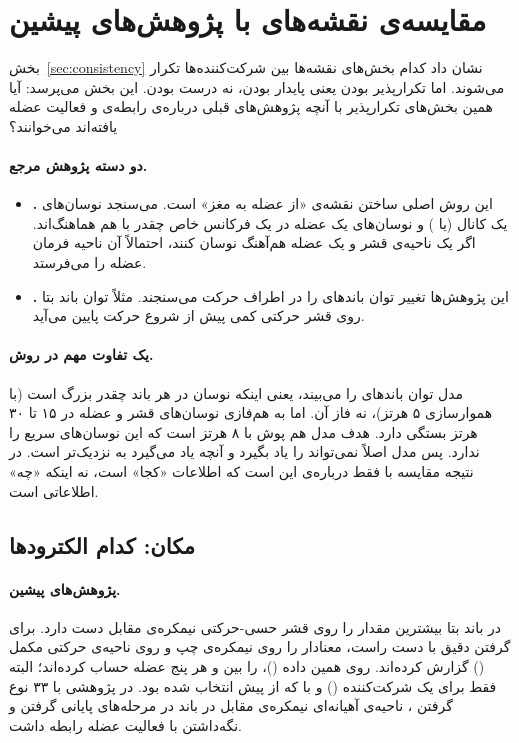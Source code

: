 \FloatBarrier
\section{مقایسه‌ی نقشه‌های  با پژوهش‌های پیشین}
\label{sec:literature}

بخش~\ref{sec:consistency} نشان داد کدام بخش‌های نقشه‌ها بین شرکت‌کننده‌ها تکرار می‌شوند. اما تکرارپذیر بودن یعنی پایدار بودن، نه درست بودن. این بخش می‌پرسد: آیا همین بخش‌های تکرارپذیر با آنچه پژوهش‌های قبلی درباره‌ی رابطه‌ی  و فعالیت عضله یافته‌اند می‌خوانند؟

\paragraph{دو دسته پژوهش مرجع.}
\begin{itemize}
\item \textbf{.} این روش اصلی ساختن نقشه‌ی «از عضله به مغز» است.  می‌سنجد نوسان‌های یک کانال  (یا ) و نوسان‌های  یک عضله در یک فرکانس خاص چقدر با هم هماهنگ‌اند. اگر یک ناحیه‌ی قشر و یک عضله هم‌آهنگ نوسان کنند، احتمالاً آن ناحیه فرمان عضله را می‌فرستد.
\item \textbf{.} این پژوهش‌ها تغییر توان باندهای  را در اطراف حرکت می‌سنجند. مثلاً توان باند بتا روی قشر حرکتی کمی پیش از شروع حرکت پایین می‌آید.
\end{itemize}

\paragraph{یک تفاوت مهم در روش.} مدل  توان باندهای  را می‌بیند، یعنی اینکه نوسان در هر باند چقدر بزرگ است (با هموارسازی ۵ هرتز)، نه فاز آن.  اما به هم‌فازی نوسان‌های قشر و عضله در ۱۵ تا ۳۰ هرتز بستگی دارد. هدف مدل هم پوش  با  ۸ هرتز است که این نوسان‌های سریع را ندارد. پس مدل اصلاً نمی‌تواند  را یاد بگیرد و آنچه یاد می‌گیرد به  نزدیک‌تر است. در نتیجه مقایسه با  فقط درباره‌ی این است که اطلاعات «کجا» است، نه اینکه «چه» اطلاعاتی است.

\subsection{مکان: کدام الکترودها}

\paragraph{پژوهش‌های پیشین.}  در باند بتا بیشترین مقدار را روی قشر حسی-حرکتی نیمکره‌ی مقابل دست دارد. برای گرفتن دقیق با دست راست، \cite{chen2013}  معنادار را روی  نیمکره‌ی چپ و روی ناحیه‌ی حرکتی مکمل () گزارش کرده‌اند. روی همین داده ()، \cite{cisotto2018}  را بین  و هر پنج عضله حساب کرده‌اند؛ البته فقط برای یک شرکت‌کننده () و با  که از پیش انتخاب شده بود. در پژوهشی با ۳۳ نوع گرفتن \cite{sburlea2018}،  ناحیه‌ی آهیانه‌ای نیمکره‌ی مقابل در باند  در مرحله‌های پایانی گرفتن و نگه‌داشتن با فعالیت عضله رابطه داشت.

